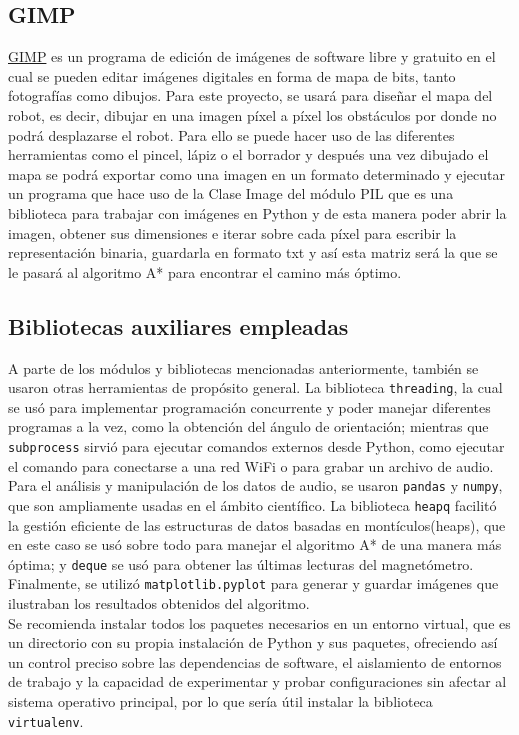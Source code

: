 \subsection{GIMP}
\label{subsec:gimp}

\hyperlink{GIMP}{GIMP} es un programa de edición de imágenes de software libre y gratuito en el cual se pueden editar imágenes digitales en forma de mapa de bits, tanto fotografías como dibujos. Para este proyecto, se usará para diseñar el mapa del robot, es decir, dibujar en una imagen píxel a píxel los obstáculos por donde no podrá desplazarse el robot. Para ello se puede hacer uso de las diferentes herramientas como el pincel, lápiz o el borrador y después una vez dibujado el mapa se podrá exportar como una imagen en un formato determinado y ejecutar un programa que hace uso de la Clase Image del módulo PIL que es una biblioteca para trabajar con imágenes en Python y de esta manera poder abrir la imagen, obtener sus dimensiones e iterar sobre cada píxel para escribir la representación binaria, guardarla en formato txt y así esta matriz será la que se le pasará al algoritmo A* para encontrar el camino más óptimo.


\subsection{Bibliotecas auxiliares empleadas}
\label{subsec:bibliotecas}

A parte de los módulos y bibliotecas mencionadas anteriormente, también se usaron otras herramientas de propósito general. La biblioteca \texttt{threading}, la cual se usó para implementar programación concurrente y poder manejar diferentes programas a la vez, como la obtención del ángulo de orientación; mientras que \texttt{subprocess} sirvió para ejecutar comandos externos desde Python, como ejecutar el comando para conectarse a una red WiFi o para grabar un archivo de audio. Para el análisis y manipulación de los datos de audio, se usaron \texttt{pandas} y \texttt{numpy}, que son ampliamente usadas en el ámbito científico. La biblioteca \texttt{heapq} facilitó la gestión eficiente de las estructuras de datos basadas en montículos(heaps), que en este caso se usó sobre todo para manejar el algoritmo A* de una manera más óptima; y \texttt{deque} se usó para obtener las últimas lecturas del magnetómetro. Finalmente, se utilizó \texttt{matplotlib.pyplot} para generar y guardar imágenes que ilustraban los resultados obtenidos del algoritmo.\\

Se recomienda instalar todos los paquetes necesarios en un entorno virtual, que es un directorio con su propia instalación de Python y sus paquetes, ofreciendo así un control preciso sobre las dependencias de software, el aislamiento de entornos de trabajo y la capacidad de experimentar y probar configuraciones sin afectar al sistema operativo principal, por lo que sería útil instalar la biblioteca \texttt{virtualenv}.


